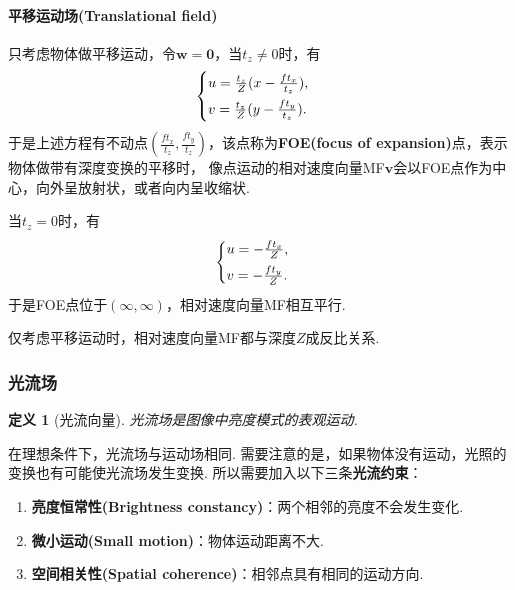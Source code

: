 \documentclass[12pt, a4paper, oneside]{ctexart}
\newtheorem{definition}{定义}
\numberwithin{equation}{section}  %
\theoremstyle{definition}
\def\bd{\boldsymbol}        %
\def\add{\vspace{1ex}}      %
\begin{document}
\paragraph{平移运动场(Translational field)}
只考虑物体做平移运动，令$\bd{w} = \bd{0}$，当$t_z\neq 0$时，有
\begin{equation*}
    \begin{cases}
        u = \frac{t_z}{Z}(x-\frac{ft_x}{t_z}),\add\\
        v = \frac{t_z}{Z}(y-\frac{ft_y}{t_z}).
    \end{cases}
\end{equation*}
于是上述方程有不动点$(\frac{ft_x}{t_z}, \frac{ft_y}{t_z})$，该点称为\textbf{FOE(focus of expansion)}点，表示物体做带有深度变换的平移时，
像点运动的相对速度向量MF$\bd{v}$会以FOE点作为中心，向外呈放射状，或者向内呈收缩状.

当$t_z = 0 $时，有
\begin{equation*}
    \begin{cases}
        u = -\frac{ft_x}{Z},\add\\
        v = -\frac{ft_y}{Z}.
    \end{cases}
\end{equation*}
于是FOE点位于$(\infty, \infty)$，相对速度向量MF相互平行.

仅考虑平移运动时，相对速度向量MF都与深度$Z$成反比关系.
\subsubsection{光流场}
\begin{definition}[光流向量]
    光流场是图像中亮度模式的表观运动.
\end{definition}
在理想条件下，光流场与运动场相同. 需要注意的是，如果物体没有运动，光照的变换也有可能使光流场发生变换. 所以需要加入以下三条\textbf{光流约束}：
\begin{enumerate}
    \item \textbf{亮度恒常性(Brightness constancy)}：两个相邻的亮度不会发生变化.
    \item \textbf{微小运动(Small motion)}：物体运动距离不大.
    \item \textbf{空间相关性(Spatial coherence)}：相邻点具有相同的运动方向.
\end{enumerate}
\end{document}
